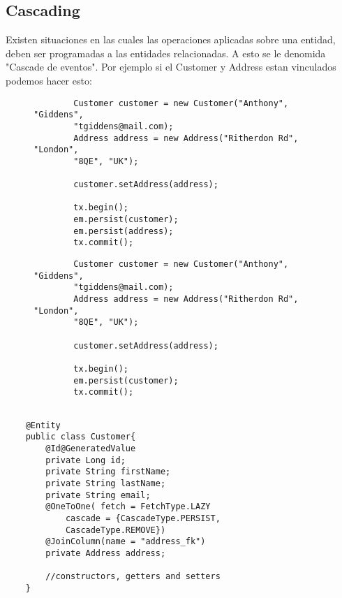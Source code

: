 \documentclass{article}
\begin{document}
\subsection*{Cascading}
Existen situaciones en las cuales las operaciones aplicadas sobre una entidad, deben ser programadas a las entidades relacionadas.
A esto se le denomida "Cascade de eventos". Por ejemplo si el Customer y Address estan vinculados podemos hacer esto:

\begin{figure}
	\begin{lstlisting}
        Customer customer = new Customer("Anthony", "Giddens",
        "tgiddens@mail.com); 
        Address address = new Address("Ritherdon Rd", "London",
        "8QE", "UK");
        
        customer.setAddress(address);
        
        tx.begin();
        em.persist(customer);
        em.persist(address);
        tx.commit();
    \end{lstlisting}
\end{figure}

\newpage

\begin{figure}
	\begin{lstlisting}
        Customer customer = new Customer("Anthony", "Giddens",
        "tgiddens@mail.com); 
        Address address = new Address("Ritherdon Rd", "London",
        "8QE", "UK");
    
        customer.setAddress(address);
    
        tx.begin();
        em.persist(customer);
        tx.commit();
    
    \end{lstlisting}
\end{figure}

\begin{lstlisting}
    @Entity
    public class Customer{
        @Id@GeneratedValue
        private Long id;
        private String firstName;
        private String lastName;
        private String email;
        @OneToOne( fetch = FetchType.LAZY
            cascade = {CascadeType.PERSIST,
            CascadeType.REMOVE})
        @JoinColumn(name = "address_fk")
        private Address address;

        //constructors, getters and setters
    }
\end{lstlisting}
\end{document}
